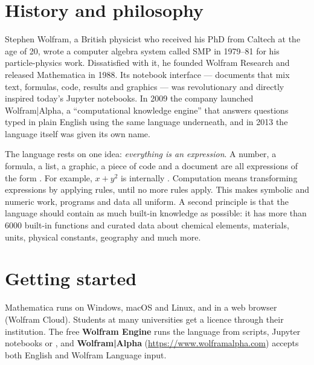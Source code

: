 
\section{History and philosophy}

\begin{history}
Stephen Wolfram, a British physicist who received his PhD from Caltech at the age of 20,
wrote a computer algebra system called SMP in 1979--81 for his particle-physics work.
Dissatisfied with it, he founded Wolfram Research and released Mathematica in 1988. Its
notebook interface --- documents that mix text, formulas, code, results and graphics ---
was revolutionary and directly inspired today's Jupyter notebooks. In 2009 the company
launched Wolfram|Alpha, a ``computational knowledge engine'' that answers questions typed
in plain English using the same language underneath, and in 2013 the language itself was
given its own name.
\end{history}

The language rests on one idea: \emph{everything is an expression}. A number, a formula, a
list, a graphic, a piece of code and a document are all expressions of the form
. For example, $x + y^2$ is internally
. Computation means transforming expressions by applying
rules, until no more rules apply. This makes symbolic and numeric work, programs and data
all uniform. A second principle is that the language should contain as much built-in
knowledge as possible: it has more than 6000 built-in functions and curated data about
chemical elements, materials, units, physical constants, geography and much more.

\section{Getting started}

Mathematica runs on Windows, macOS and Linux, and in a web browser (Wolfram Cloud).
Students at many universities get a licence through their institution. The free
\textbf{Wolfram Engine} runs the language from scripts, Jupyter notebooks or \py, and
\textbf{Wolfram|Alpha} (\url{https://www.wolframalpha.com}) accepts both English and
Wolfram Language input.

